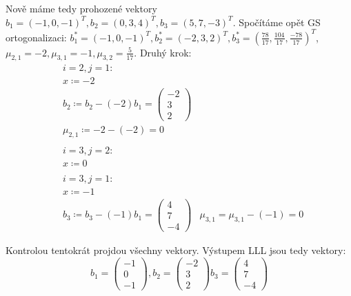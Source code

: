 \documentclass[12pt, a4paper]{article}
\begin{document}
Nově máme tedy prohozené vektory $b_1 = (-1, 0, -1)^T, b_2 = (0, 3, 4)^T, b_3 = (5, 7, -3)^T$. Spočítáme opět GS ortogonalizaci: $b_1^* = (-1, 0, -1)^T, b_2^* = (-2, 3, 2)^T, b_3^* = (\frac{78}{17}, \frac{104}{17}, \frac{-78}{17})^T$, $\mu_{2,1} = -2, \mu_{3,1} = -1, \mu_{3,2} = \frac{5}{17}$. Druhý krok:
\begin{align*}
&i=2, j=1:\\
&x \coloneqq -2\\
&b_2 \coloneqq  b_2 - (-2)b_1 = \begin{pmatrix}
-2\\
3\\
2
\end{pmatrix}\\
&\mu_{2,1} \coloneqq -2 - (-2) = 0\\\\
&i=3, j=2:\\
&x \coloneqq 0\\\\
&i=3, j=1:\\
&x \coloneqq -1\\
&b_3 \coloneqq b_3 - (-1)b_1 = \begin{pmatrix}
4\\
7\\
-4
\end{pmatrix}
&\mu_{3,1} = \mu_{3,1} - (-1) = 0
\end{align*}

Kontrolou tentokrát projdou všechny vektory. Výstupem LLL jsou tedy vektory:
\[
b_1 = \begin{pmatrix}
-1\\
0\\
-1
\end{pmatrix},
b_2 = \begin{pmatrix}
-2\\
3\\
2
\end{pmatrix}
b_3 = \begin{pmatrix}
4\\
7\\
-4
\end{pmatrix}
\]
\end{document}
